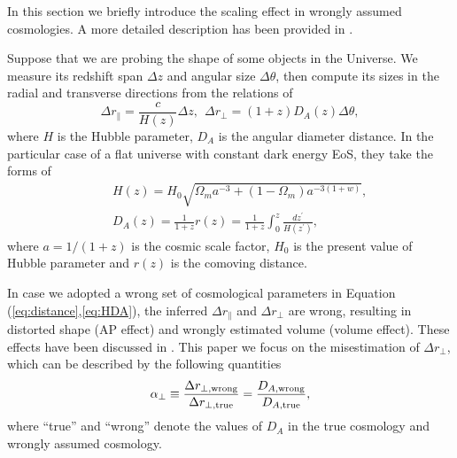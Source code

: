 \documentclass[iop]{emulateapj}
\begin{document}
In this section we briefly introduce the scaling effect in wrongly assumed cosmologies.
A more detailed description has been provided in \cite{Li2014,Li2015,Li2016}.

Suppose that we are probing the shape of some objects in the Universe.
We measure its redshift span $\Delta z$ and angular size $\Delta \theta$,
then compute its sizes in the radial and transverse directions from the relations of 
\begin{equation}\label{eq:distance}
\Delta r_{\parallel} = \frac{c}{H(z)}\Delta z,\ \ \Delta r_{\bot}=(1+z)D_A(z)\Delta \theta,
\end{equation}
where $H$ is the Hubble parameter, $D_A$ is the angular diameter distance.
In the particular case of a flat universe with constant dark energy EoS, they take the forms of
\begin{eqnarray}\label{eq:HDA}
& &H(z) = H_0\sqrt{\Omega_ma^{-3}+(1-\Omega_m)a^{-3(1+w)}},\nonumber\\
& &D_A(z) = \frac{1}{1+z}r(z)=\frac{1}{1+z}\int_0^z \frac{dz^\prime}{H(z^\prime)},
\end{eqnarray}
where $a=1/(1+z)$ is the cosmic scale factor,
$H_0$ is the present value of Hubble parameter and $r(z)$ is the comoving distance.

In case we adopted a wrong set of cosmological parameters in Equation (\ref{eq:distance},\ref{eq:HDA}),
the inferred $\Delta r_{\parallel}$ and $\Delta r_{\bot}$ are wrong,
resulting in distorted shape (AP effect) and wrongly estimated volume (volume effect).
These effects have been discussed in \cite{Li2014,Li2015,Li2016}.
This paper we focus on the misestimation of $\Delta r_{\bot}$,%
which can be described by the following quantities
\begin{equation}\label{eq:DA}
 \alpha_{\bot} \equiv \frac{\Delta r_{\bot, \rm wrong}}{\Delta r_{\bot, \rm true}}
 = \frac{D_{A, \rm wrong}}{D_{A, \rm true}},
\end{equation}
where ``true'' and ``wrong'' denote the values of $D_A$ in the true cosmology and wrongly assumed cosmology.
\end{document}
